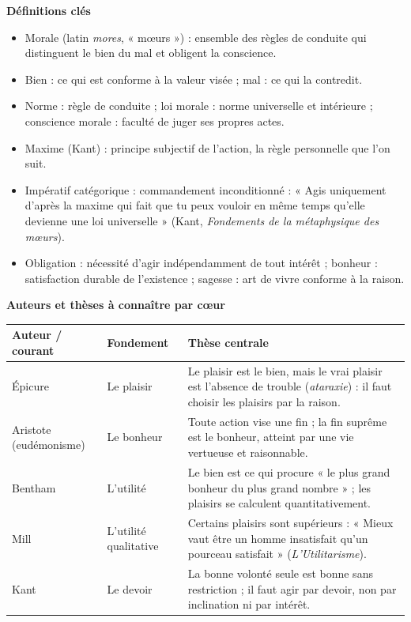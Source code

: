 \documentclass[11pt]{article}
\newcommand{\cle}[1]{{\popxbold\color{popdark}#1}}
\begin{document}
\begin{bilan}
\textbf{Définitions clés}
\begin{itemize}
  \item \cle{Morale} (latin \emph{mores}, « mœurs ») : ensemble des règles de conduite qui distinguent le bien du mal et obligent la conscience.
  \item \cle{Bien} : ce qui est conforme à la valeur visée ; \cle{mal} : ce qui la contredit.
  \item \cle{Norme} : règle de conduite ; \cle{loi morale} : norme universelle et intérieure ; \cle{conscience morale} : faculté de juger ses propres actes.
  \item \cle{Maxime} (Kant) : principe subjectif de l'action, la règle personnelle que l'on suit.
  \item \cle{Impératif catégorique} : commandement inconditionné : « Agis uniquement d'après la maxime qui fait que tu peux vouloir en même temps qu'elle devienne une loi universelle » (Kant, \emph{Fondements de la métaphysique des mœurs}).
  \item \cle{Obligation} : nécessité d'agir indépendamment de tout intérêt ; \cle{bonheur} : satisfaction durable de l'existence ; \cle{sagesse} : art de vivre conforme à la raison.
\end{itemize}

\textbf{Auteurs et thèses à connaître par cœur}
\begin{center}
\begin{tabularx}{\linewidth}{|l|X|X|}
\hline
\rowcolor{popblueL} \textbf{Auteur / courant} & \textbf{Fondement} & \textbf{Thèse centrale} \\
\hline
Épicure & Le plaisir & Le plaisir est le bien, mais le vrai plaisir est l'absence de trouble (\emph{ataraxie}) : il faut choisir les plaisirs par la raison. \\
\hline
Aristote (eudémonisme) & Le bonheur & Toute action vise une fin ; la fin suprême est le bonheur, atteint par une vie vertueuse et raisonnable. \\
\hline
Bentham & L'utilité & Le bien est ce qui procure « le plus grand bonheur du plus grand nombre » ; les plaisirs se calculent quantitativement. \\
\hline
Mill & L'utilité qualitative & Certains plaisirs sont supérieurs : « Mieux vaut être un homme insatisfait qu'un pourceau satisfait » (\emph{L'Utilitarisme}). \\
\hline
Kant & Le devoir & La bonne volonté seule est bonne sans restriction ; il faut agir par devoir, non par inclination ni par intérêt. \\
\hline
\end{tabularx}
\end{center}


\end{bilan}
\end{document}
